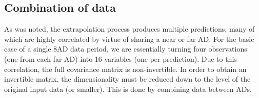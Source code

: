 \documentclass[../thesis.tex]{subfiles}
\begin{document}
\begin{comment}
In the fit, we compare the far site measurement to the far site prediction as obtained from the near sites. Statistical uncertainty arises from both the near sites (in the form of fluctuations in the far site prediction) and from the far site data itself. We have the two expressions for each component.

Without affecting the fit, we can simplify the situation by assigning both components of the statistical uncertainty to the far site \emph{predictions}, with no error bars on the far site data.

The predictions at the same far AD, but from different near ADs, are statistically correlated via the statistical fluctuations at the far AD. The resulting covariance is the product of the two $\sigma_{\mathrm{far}}$.

Likewise, the predictions at different far ADs, but from the same near AD, are correlated via the fluctuations at the near AD. This gives a covariance of the product of the two $\sigma_{\mathrm{near}}$.

I don't know how to prove these claims about the covariances.

From this we can straightforwardly generalize to the full statistical covariance matrix across all ADs, energy bins, and data periods.
\end{comment}

\subsection{Combination of data}
\label{sec:fitCombo}

As was noted, the extrapolation process produces multiple predictions, many of which are highly correlated by virtue of sharing a near or far AD. For the basic case of a single 8AD data period, we are essentially turning four observations (one from each far AD) into 16 variables (one per prediction). Due to this correlation, the full covariance matrix is non-invertible. In order to obtain an invertible matrix, the dimensionality must be reduced down to the level of the original input data (or smaller). This is done by combining data between ADs.
\end{document}
